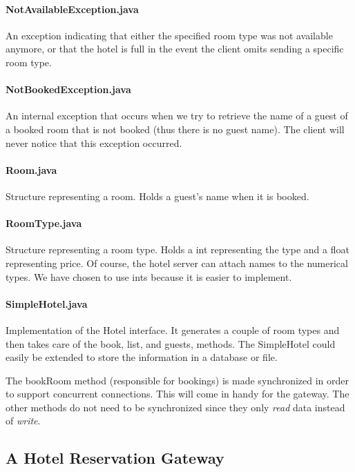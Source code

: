 \documentclass[a4paper,10pt]{article}
\begin{document}
\paragraph{NotAvailableException.java}
An exception indicating that either the specified room type was not available anymore, or that the hotel is full in the event the client omits sending a specific room type.

\paragraph{NotBookedException.java}
An internal exception that occurs when we try to retrieve the name of a guest of a booked room that is not booked (thus there is no guest name). The client will never notice that this exception occurred.

\paragraph{Room.java}
Structure representing a room. Holds a guest's name when it is booked.

\paragraph{RoomType.java}
Structure representing a room type. Holds a int representing the type and a float representing price. Of course, the hotel server can attach names to the numerical types. We have chosen to use ints because it is easier to implement.

\paragraph{SimpleHotel.java}
Implementation of the Hotel interface. It generates a couple of room types and then takes care of the book, list, and guests, methods. The SimpleHotel could easily be extended to store the information in a database or file.

The bookRoom method (responsible for bookings) is made synchronized in order to support concurrent connections. This will come in handy for the gateway. The other methods do not need to be synchronized since they only \emph{read} data instead of \emph{write}.

\subsection{A Hotel Reservation Gateway}\label{sec:gateway}
\end{document}
